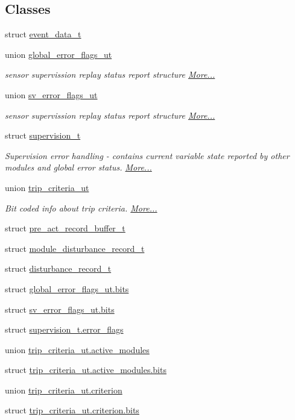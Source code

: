 \subsection*{Classes}
\begin{DoxyCompactItemize}
\item 
struct \hyperlink{a00003_d0/d89/a00071}{event\+\_\+data\+\_\+t}
\item 
union \hyperlink{a00003_db/df8/a00076}{global\+\_\+error\+\_\+flags\+\_\+ut}
\begin{DoxyCompactList}\small\item\em sensor supervission replay status report structure  \hyperlink{a00003_db/df8/a00076}{More...}\end{DoxyCompactList}\item 
union \hyperlink{a00003_d2/df5/a00137}{sv\+\_\+error\+\_\+flags\+\_\+ut}
\begin{DoxyCompactList}\small\item\em sensor supervission replay status report structure  \hyperlink{a00003_d2/df5/a00137}{More...}\end{DoxyCompactList}\item 
struct \hyperlink{a00003_d5/d5b/a00135}{supervision\+\_\+t}
\begin{DoxyCompactList}\small\item\em Supervision error handling -\/ contains current variable state reported by other modules and global error status.  \hyperlink{a00003_d5/d5b/a00135}{More...}\end{DoxyCompactList}\item 
union \hyperlink{a00003_de/d14/a00139}{trip\+\_\+criteria\+\_\+ut}
\begin{DoxyCompactList}\small\item\em Bit coded info about trip criteria.  \hyperlink{a00003_de/d14/a00139}{More...}\end{DoxyCompactList}\item 
struct \hyperlink{a00003_d4/d7d/a00093}{pre\+\_\+act\+\_\+record\+\_\+buffer\+\_\+t}
\item 
struct \hyperlink{a00008}{module\+\_\+disturbance\+\_\+record\+\_\+t}
\item 
struct \hyperlink{a00003_df/d5f/a00064}{disturbance\+\_\+record\+\_\+t}
\item 
struct \hyperlink{a00003_d1/d09/a00077}{global\+\_\+error\+\_\+flags\+\_\+ut.\+bits}
\item 
struct \hyperlink{a00003_d4/ddd/a00138}{sv\+\_\+error\+\_\+flags\+\_\+ut.\+bits}
\item 
struct \hyperlink{a00003_d0/d5e/a00136}{supervision\+\_\+t.\+error\+\_\+flags}
\item 
union \hyperlink{a00003_d5/db1/a00140}{trip\+\_\+criteria\+\_\+ut.\+active\+\_\+modules}
\item 
struct \hyperlink{a00003_d5/d4e/a00141}{trip\+\_\+criteria\+\_\+ut.\+active\+\_\+modules.\+bits}
\item 
union \hyperlink{a00003_d2/d82/a00142}{trip\+\_\+criteria\+\_\+ut.\+criterion}
\item 
struct \hyperlink{a00003_d7/dce/a00143}{trip\+\_\+criteria\+\_\+ut.\+criterion.\+bits}
\end{DoxyCompactItemize}
